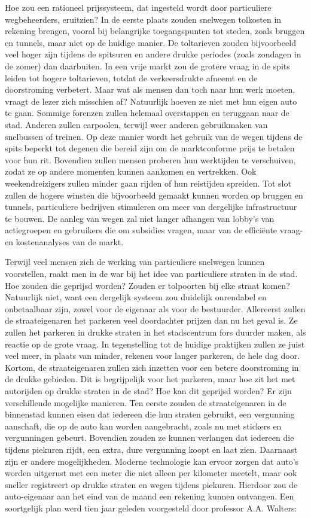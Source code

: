 \documentclass[
  a5paper,
  smalldemyvopaper,10pt,twoside,onecolumn,openright,extrafontsizes,hidelinks]{memoir}
\begin{document}
Hoe zou een rationeel prijssysteem, dat ingesteld wordt door
particuliere wegbeheerders, eruitzien? In de eerste plaats zouden
snelwegen tolkosten in rekening brengen, vooral bij belangrijke
toegangspunten tot steden, zoals bruggen en tunnels, maar niet op de
huidige manier. De toltarieven zouden bijvoorbeeld veel hoger zijn
tijdens de spitsuren en andere drukke periodes (zoals zondagen in de
zomer) dan daarbuiten. In een vrije markt zou de grotere vraag in de
spits leiden tot hogere toltarieven, totdat de verkeersdrukte afneemt en
de doorstroming verbetert. Maar wat als mensen dan toch naar hun werk
moeten, vraagt de lezer zich misschien af? Natuurlijk hoeven ze niet met
hun eigen auto te gaan. Sommige forenzen zullen helemaal overstappen en
teruggaan naar de stad. Anderen zullen carpoolen, terwijl weer anderen
gebruikmaken van snelbussen of treinen. Op deze manier wordt het gebruik
van de wegen tijdens de spits beperkt tot degenen die bereid zijn om de
marktconforme prijs te betalen voor hun rit. Bovendien zullen mensen
proberen hun werktijden te verschuiven, zodat ze op andere momenten
kunnen aankomen en vertrekken. Ook weekendreizigers zullen minder gaan
rijden of hun reistijden spreiden. Tot slot zullen de hogere winsten die
bijvoorbeeld gemaakt kunnen worden op bruggen en tunnels, particuliere
bedrijven stimuleren om meer van dergelijke infrastructuur te bouwen. De
aanleg van wegen zal niet langer afhangen van lobby's van actiegroepen
en gebruikers die om subsidies vragen, maar van de efficiënte vraag- en
kostenanalyses van de markt.

Terwijl veel mensen zich de werking van particuliere snelwegen kunnen
voorstellen, raakt men in de war bij het idee van particuliere straten
in de stad. Hoe zouden die geprijsd worden? Zouden er tolpoorten bij
elke straat komen? Natuurlijk niet, want een dergelijk systeem zou
duidelijk onrendabel en onbetaalbaar zijn, zowel voor de eigenaar als
voor de bestuurder. Allereerst zullen de straateigenaren het parkeren
veel doordachter prijzen dan nu het geval is. Ze zullen het parkeren in
drukke straten in het stadscentrum fors duurder maken, als reactie op de
grote vraag. In tegenstelling tot de huidige praktijken zullen ze juist
veel meer, in plaats van minder, rekenen voor langer parkeren, de hele
dag door. Kortom, de straateigenaren zullen zich inzetten voor een
betere doorstroming in de drukke gebieden. Dit is begrijpelijk voor het
parkeren, maar hoe zit het met autorijden op drukke straten in de stad?
Hoe kan dit geprijsd worden? Er zijn verschillende mogelijke manieren.
Ten eerste zouden de straateigenaren in de binnenstad kunnen eisen dat
iedereen die hun straten gebruikt, een vergunning aanschaft, die op de
auto kan worden aangebracht, zoals nu met stickers en vergunningen
gebeurt. Bovendien zouden ze kunnen verlangen dat iedereen die tijdens
piekuren rijdt, een extra, dure vergunning koopt en laat zien. Daarnaast
zijn er andere mogelijkheden. Moderne technologie kan ervoor zorgen dat
auto's worden uitgerust met een meter die niet alleen per kilometer
meetelt, maar ook sneller registreert op drukke straten en wegen tijdens
piekuren. Hierdoor zou de auto-eigenaar aan het eind van de maand een
rekening kunnen ontvangen. Een soortgelijk plan werd tien jaar geleden
voorgesteld door professor A.A. Walters:
\end{document}
